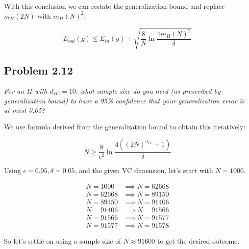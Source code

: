 \documentclass{article}
\begin{document}
  With this conclusion we can restate the generalization bound and replace $m_H(2N)$ with $m_H(N)^2$.

  $$E_{out}(g) \leq E_{in}(g) + \sqrt{\frac{8}{N}\ln\frac{4m_H(N)^2}{\delta}}$$

\subsection*{Problem 2.12}

\textit{For an $H$ with $d_{VC} = 10$, what sample size do you need (as prescribed by
generalization bound) to have a 95\% confidence that your generalization error is at most 0.05?}

We use formula derived from the generalization bound to obtain this iteratively:

$$N \geq \frac{8}{\epsilon^2}\ln\frac{4((2N)^{d_{VC}} + 1)}{\delta}$$

Using $\epsilon = 0.05, \delta = 0.05$, and the given VC dimension, let's start with $N=1000$.

\begin{align*}
  N=1000 &\implies N=62668 \\
  N=62668 &\implies N=89150 \\
  N=89150 &\implies N=91406 \\
  N=91406 &\implies N=91566 \\
  N=91566 &\implies N=91577 \\
  N=91577 &\implies N=91578
\end{align*}

So let's settle on using a sample size of $N\approx 91600$ to get the desired outcome.
\end{document}
